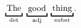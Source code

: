 \documentclass{article}
\newcommand{\ubtag}[2]{\ensuremath{\underbracket{\vphantom{j}\hspace{0.4ex}\text{#1}\hspace{0.4ex}}_\text{#2}}}
\begin{document}

\ubtag{The}{det} \ubtag{good}{adj} \ubtag{thing}{subst}.

\end{document}
